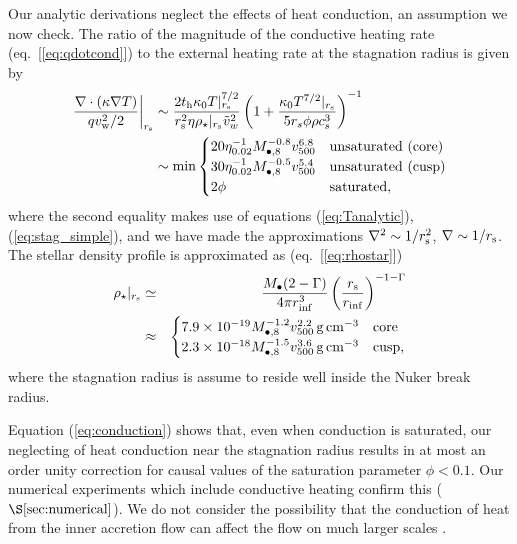 \documentclass[usenatbib,fleqn]{mn2e}
\newcommand{\rs}{r_s}
\begin{document}
Our analytic derivations neglect the effects of heat conduction, an
assumption we now check.  The ratio of the magnitude of the conductive
heating rate (eq.~[\ref{eq:qdotcond}]) to the external heating rate at
the stagnation radius is given by
\begin{align}
  \left.\frac{\nabla\cdot(\kappa \nabla T)}{q v_{\rm
w}^{2}/2}\right|_{r_{\rm s}} &\sim \frac{2t_{\rm h}\kappa_0
T|_{r_{\rm s}}^{7/2}}{r_{\rm s}^{2}\eta \rho_{\star}|_{r_{\rm s}}
\tilde{v}_{w}^{2}}
 \left(1+\frac{\kappa_0 T^{7/2}|_{r_{\rm s}}}{5 \rs
    \phi \rho c_s^3}\right)^{-1}
\nonumber \\ &\sim {\rm min}
  \begin{cases}
  20 \eta_{0.02}^{-1}
M_{\bullet,8}^{-0.8} v_{500}^{6.8} &  \text{unsaturated (core)}\\
 30 \eta_{0.02}^{-1}
M_{\bullet,8}^{-0.5} v_{500}^{5.4} &  \text{unsaturated (cusp)}\\
  2 \phi & \text{saturated},
  \end{cases}
 \label{eq:conduction}
\end{align}
where the second equality makes use of equations (\ref{eq:Tanalytic}),
(\ref{eq:stag_simple}), and we have made the approximations $\nabla^{2} \sim
1/r_{\rm s}^{2}$, $\nabla \sim 1/r_{\rm s}$.  The
stellar density profile is approximated as (eq.~[\ref{eq:rhostar}])
\begin{eqnarray}
  \rho_{\star}|_{r_{\rm s}} &\simeq& \frac{M_{\bullet}(2-\Gamma)}{4\pi r_{\rm inf}^{3}}\left(\frac{r_{\rm s}}{r_{\rm inf}}\right)^{-1-\Gamma} \nonumber \\
 &\approx& \begin{cases}
    7.9 \times 10^{-19}M_{\bullet,8}^{-1.2}v_{500}^{2.2}\,{\rm g\,cm^{-3}}
    & \text{core} \\
    2.3 \times 10^{-18} M_{\bullet,8}^{-1.5}v_{500}^{3.6}
    \,{\rm g\,cm^{-3}}  & \text{cusp}, 
  \end{cases}
  \label{eq:rhostarrs}
\end{eqnarray}
where the stagnation radius is assume to reside well inside the Nuker
break radius.  

Equation (\ref{eq:conduction}) shows that, even when conduction is
saturated, our neglecting of heat conduction near the stagnation
radius results in at most an order unity correction for causal values
of the saturation parameter $\phi < 0.1$.  Our numerical experiments
which include conductive heating confirm this
($\S\ref{sec:numerical}$).  We do not consider the possibility that
the conduction of heat from the inner accretion flow can affect
the flow on much larger scales \citep{Johnson+2007}.  
\end{document}
